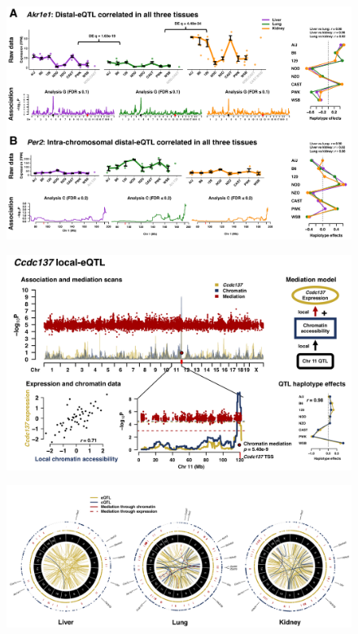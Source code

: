 \documentclass[10pt,letterpaper]{article}
\begin{document}
\begin{figure}[hp]
\includegraphics[width=\textwidth, trim={0in 0in 0in 0in}, clip]{figs/correlated_distal_eqtl.pdf}
\caption{}
\end{figure}

\newpage

\begin{figure}[hp]
\includegraphics[width=\textwidth, trim={0in 0in 0in 0in}, clip]{figs/ccdc137_mediation.png}
\caption{}
\end{figure}

\newpage

\begin{figure}[hp]
\includegraphics[width=\textwidth, trim={0in 0in 0in 0in}, clip]{figs/circos_over_tissues.png}
\caption{}
\end{figure}
\end{document}
